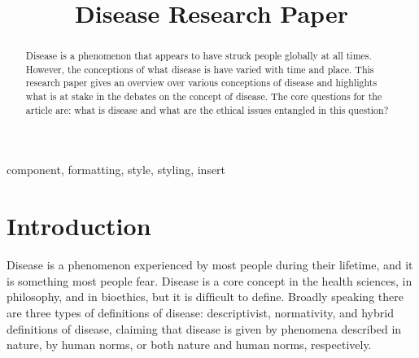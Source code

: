 \documentclass[conference]{IEEEtran}
\begin{document}
\title{Disease Research Paper\\


}

\author{
\and
{}
\and
{}

}

\maketitle

\begin{abstract}
Disease is a phenomenon that appears to have struck people globally at all times. However, the conceptions of what disease is have varied with time and place. This research paper gives an overview over various conceptions of disease and highlights what is at stake in the debates on the concept of disease. The core questions for the article are: what is disease and what are the ethical issues entangled in this question?
\end{abstract}

\begin{IEEEkeywords}
component, formatting, style, styling, insert
\end{IEEEkeywords}

\section{Introduction}
Disease is a phenomenon experienced by most people during their lifetime, and it is something most people fear. Disease is a core concept in the health sciences, in philosophy, and in bioethics, but it is difﬁcult to deﬁne. Broadly speaking there are three types of deﬁnitions of disease: descriptivist, normativity, and hybrid deﬁnitions of disease, claiming that disease is given by phenomena described in nature, by human norms, or both nature and human norms, respectively.
\end{document}
